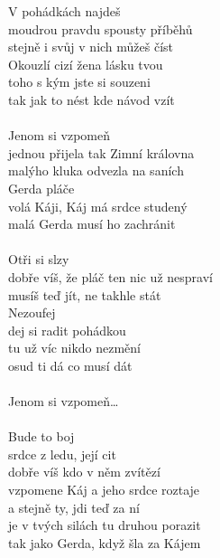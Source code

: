
\CSiroky{} \GSiroky{} \FSiroky{} \Ami 

V pohádkách najdeš\\
moudrou pravdu spousty příběhů\\
stejně i svůj v nich můžeš číst\\
Okouzlí cizí žena lásku tvou\\
toho s kým jste si souzeni\\
tak jak to nést kde návod vzít\\
\\
Jenom si vzpomeň\\
jednou přijela tak Zimní královna\\
malýho kluka odvezla na saních\\
Gerda pláče\\
volá Káji, Káj má srdce studený\\
malá Gerda musí ho zachránit\\
\\
Otři si slzy\\
dobře víš, že pláč ten nic už nespraví\\
musíš teď jít, ne takhle stát\\
Nezoufej\\
dej si radit pohádkou\\
tu už víc nikdo nezmění\\
osud ti dá co musí dát\\
\\
Jenom si vzpomeň\ldots\\
\\
Bude to boj\\
srdce z ledu, její cit\\
dobře víš kdo v něm zvítězí\\
vzpomene Káj a jeho srdce roztaje\\
a stejně ty, jdi teď za ní\\
je v tvých silách tu druhou porazit\\
tak jako Gerda, když šla za Kájem \\
